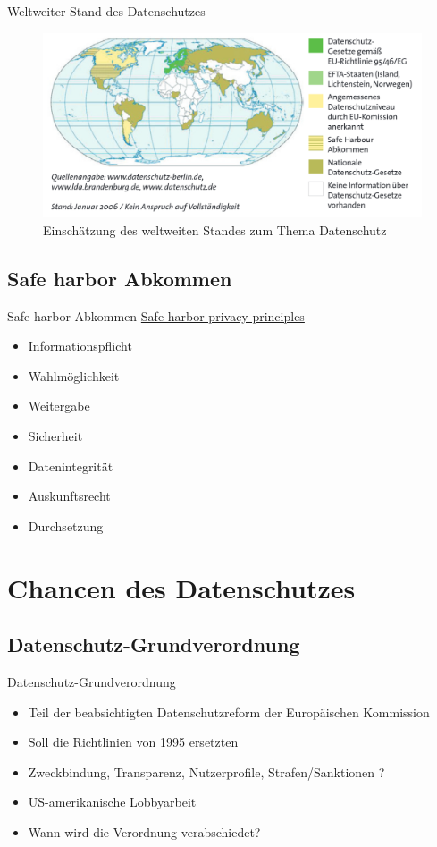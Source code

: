 \documentclass{beamer}
\begin{document}
\begin{frame}{Weltweiter Stand des Datenschutzes}
\begin{figure}[h]
\begin{center}
	\includegraphics[scale=0.28]{pics/datenschutzstand.png}
\end{center}
\caption{Einschätzung des weltweiten Standes zum Thema Datenschutz}
\label{pic:worldmap}
\end{figure}
\end{frame}

\subsection{Safe harbor Abkommen}
\begin{frame}{Safe harbor Abkommen}
\underline{Safe harbor privacy principles}
\begin{itemize}
	\item Informationspflicht
	\item Wahlmöglichkeit
	\item Weitergabe
	\item Sicherheit
	\item Datenintegrität
	\item Auskunftsrecht
	\item Durchsetzung
\end{itemize}
\end{frame}

\section{Chancen des Datenschutzes}
\subsection{Datenschutz-Grundverordnung}

\begin{frame}{Datenschutz-Grundverordnung}
\begin{itemize}
\item Teil der beabsichtigten Datenschutzreform der Europäischen Kommission
\item Soll die Richtlinien von 1995 ersetzten
\item Zweckbindung, Transparenz, Nutzerprofile, Strafen/Sanktionen ?
\item US-amerikanische Lobbyarbeit
\item Wann wird die Verordnung verabschiedet?
\end{itemize}
\end{frame}
\end{document}
